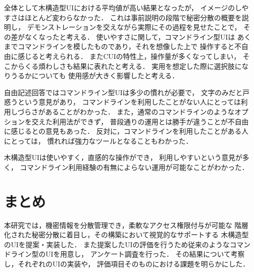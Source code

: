 \documentclass[twocolumn, fleqn, uplatex]{jsarticle}
\begin{document}
\begin{table}[htbp]
	\centering
	\caption{Average of survey results.}
	\label{tab:result}
\end{table}

全体として木構造型UIにおける平均値が高い結果となったが，%
イメージのしやすさはほとんど変わらなかった．%
これは事前説明の段階で秘密分散の概要を説明し，%
デモンストレーションを交えながら実際にその過程を見せたことで，%
その差がなくなったと考える．
使いやすさに関して，コマンドライン型UIは%
あくまでコマンドラインを模したものであり，それを想像した上で%
操作すると不自由に感じると考えられる．%
またCUIの特性上，操作量が多くなってしまい，%
そこからくる煩わしさも結果に表れたと考える．
実用を想定した際に選択肢になりうるかについても%
使用感が大きく影響したと考える．

自由記述回答ではコマンドライン型UIは多少の慣れが必要で，%
文字のみだと戸惑うという意見があり，%
コマンドラインを利用したことがない人にとっては利用しづらさがあることがわかった．%
また，通常のコマンドラインのようなオプションを交えた利用法ができず，%
普段通りの運用とは勝手が違うことが不自由に感じるとの意見もあった．
反対に，コマンドラインを利用したことがある人にとっては，%
慣れれば強力なツールとなることもわかった．

木構造型UIは使いやすく，直感的な操作ができ，%
利用しやすいという意見が多く，%
コマンドライン利用経験の有無によらない運用が可能なことがわかった．

\section{まとめ}
本研究では，機密情報を分散管理でき，柔軟なアクセス権限付与が可能な%
階層化された秘密分散に着目し，その構築において視覚的なサポートする%
木構造型のUIを提案・実装した．
また提案したUIの評価を行うため従来のようなコマンドライン型のUIを用意し，%
アンケート調査を行った．%
その結果について考察し，それぞれのUIの実装や，%
評価項目そのものにおける課題を明らかにした．
\end{document}
